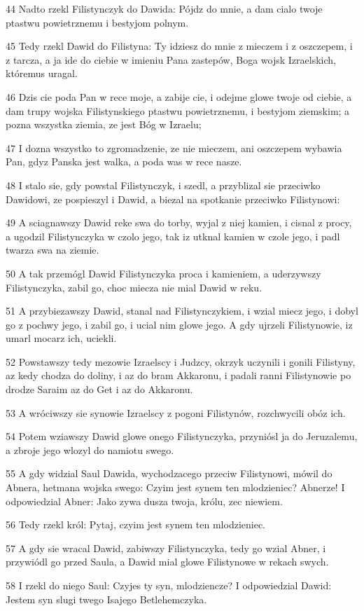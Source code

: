 \par 44 Nadto rzekl Filistynczyk do Dawida: Pójdz do mnie, a dam cialo twoje ptastwu powietrznemu i bestyjom polnym.
\par 45 Tedy rzekl Dawid do Filistyna: Ty idziesz do mnie z mieczem i z oszczepem, i z tarcza, a ja ide do ciebie w imieniu Pana zastepów, Boga wojsk Izraelskich, któremus uragal.
\par 46 Dzis cie poda Pan w rece moje, a zabije cie, i odejme glowe twoje od ciebie, a dam trupy wojska Filistynskiego ptastwu powietrznemu, i bestyjom ziemskim; a pozna wszystka ziemia, ze jest Bóg w Izraelu;
\par 47 I dozna wszystko to zgromadzenie, ze nie mieczem, ani oszczepem wybawia Pan, gdyz Panska jest walka, a poda was w rece nasze.
\par 48 I stalo sie, gdy powstal Filistynczyk, i szedl, a przyblizal sie przeciwko Dawidowi, ze pospieszyl i Dawid, a biezal na spotkanie przeciwko Filistynowi:
\par 49 A sciagnawszy Dawid reke swa do torby, wyjal z niej kamien, i cisnal z procy, a ugodzil Filistynczyka w czolo jego, tak iz utknal kamien w czole jego, i padl twarza swa na ziemie.
\par 50 A tak przemógl Dawid Filistynczyka proca i kamieniem, a uderzywszy Filistynczyka, zabil go, choc miecza nie mial Dawid w reku.
\par 51 A przybiezawszy Dawid, stanal nad Filistynczykiem, i wzial miecz jego, i dobyl go z pochwy jego, i zabil go, i ucial nim glowe jego. A gdy ujrzeli Filistynowie, iz umarl mocarz ich, uciekli.
\par 52 Powstawszy tedy mezowie Izraelscy i Judzcy, okrzyk uczynili i gonili Filistyny, az kedy chodza do doliny, i az do bram Akkaronu, i padali ranni Filistynowie po drodze Saraim az do Get i az do Akkaronu.
\par 53 A wróciwszy sie synowie Izraelscy z pogoni Filistynów, rozchwycili obóz ich.
\par 54 Potem wziawszy Dawid glowe onego Filistynczyka, przyniósl ja do Jeruzalemu, a zbroje jego wlozyl do namiotu swego.
\par 55 A gdy widzial Saul Dawida, wychodzacego przeciw Filistynowi, mówil do Abnera, hetmana wojska swego: Czyim jest synem ten mlodzieniec? Abnerze! I odpowiedzial Abner: Jako zywa dusza twoja, królu, zec niewiem.
\par 56 Tedy rzekl król: Pytaj, czyim jest synem ten mlodzieniec.
\par 57 A gdy sie wracal Dawid, zabiwszy Filistynczyka, tedy go wzial Abner, i przywiódl go przed Saula, a Dawid mial glowe Filistynowe w rekach swych.
\par 58 I rzekl do niego Saul: Czyjes ty syn, mlodziencze? I odpowiedzial Dawid: Jestem syn slugi twego Isajego Betlehemczyka.

